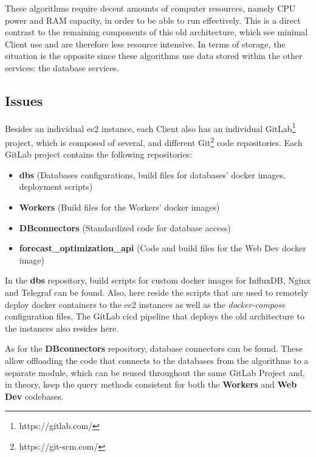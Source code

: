 These algorithms require decent amounts of computer resources, namely CPU power and RAM capacity, in order to be able to run effectively. This is a direct contrast to the remaining components of this old architecture, which see minimal Client use and are therefore less resource intensive. In terms of storage, the situation is the opposite since these algorithms use data stored within the other services: the database services.

\subsection{Issues}\label{methodology:ss:Issues}


Besides an individual \gls{ec2} instance, each Client also has an individual GitLab\footnote{https://gitlab.com/}\label{foot:gitlab} project, which is composed of several, and different Git\footnote{https://git-scm.com/}\label{foot:git} code repositories. Each GitLab project contains the following repositories:

\begin{itemize}

    \item \textbf{dbs} (Databases configurations, build files for databases' docker images, deployment scripts)
    \item \textbf{Workers} (Build files for the Workers' docker images)
    \item \textbf{DBconnectors} (Standardized code for database access)
    \item \textbf{forecast\_optimization\_api} (Code and build files for the Web Dev docker image)
    
\end{itemize}

In the \textbf{dbs} repository, build scripts for custom docker images for InfluxDB, Nginx and Telegraf can be found. Also, here reside the scripts that are used to remotely deploy docker containers to the \gls{ec2} instances as well as the \textit{docker-compose} configuration files. The GitLab \gls{cicd} pipeline that deploys the old architecture to the instances also resides here.

As for the \textbf{DBconnectors} repository, database connectors can be found. These allow offloading the code that connects to the databases from the algorithms to a separate module, which can be reused throughout the same GitLab Project and, in theory, keep the query methods consistent for both the \textbf{Workers} and \textbf{Web Dev} codebases.

